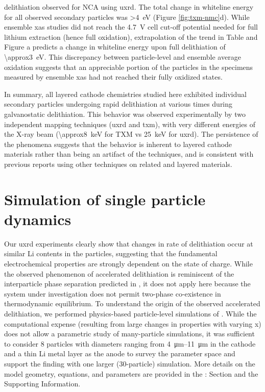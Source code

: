 \documentclass{article}
\begin{document}
delithiation observed for NCA using \gls{uxrd}. The total change in
whiteline energy for all observed secondary particles was \SI{>4}{eV}
(Figure \ref{fig:txm-nmc}d). While ensemble \gls{xas}
studies\cite{deb2005,muto2009} did not reach the \SI{4.7}{V} cell
cut-off potential needed for full lithium extraction (hence full
 oxidation), extrapolation of the trend in Table
 and Figure
a predicts a change in whiteline
energy upon full delithiation of \SI{\approx3}{eV}. This discrepancy
between particle-level and ensemble average  oxidation suggests
that an appreciable portion of the particles in the specimens measured
by ensemble \gls{xas} had not reached their fully oxidized states.

In summary, all layered cathode chemistries studied here exhibited
individual secondary particles undergoing rapid delithiation at
various times during galvanostatic delithiation. This behavior was
observed experimentally by two independent mapping techniques
(\gls{uxrd} and \gls{txm}), with very different energies of the X-ray
beam (\SI{\approx8}{\kilo\electronvolt} for TXM vs
\SI{25}{\kilo\electronvolt} for \gls{uxrd}). The persistence of the
phenomena suggests that the behavior is inherent to layered cathode
materials rather than being an artifact of the techniques, and is
consistent with previous reports using other techniques on related
\nmc{} and  layered
materials\cite{chueh2021,rao2021,wang2020-6}.

\section{Simulation of single particle dynamics}


Our \gls{uxrd} experiments clearly show that changes in rate of
delithiation occur at similar Li contents in the particles, suggesting
that the fundamental electrochemical properties are strongly dependent
on the state of charge. While the observed phenomenon of accelerated
delithiation is reminiscent of the interparticle phase separation
predicted in  \cite{boesenberg2013,thornton2014},
it does not apply here because the system under investigation does not
permit two-phase co-existence in thermodynamic equilibrium. To
understand the origin of the observed accelerated delithiation, we
performed physics-based particle-level simulations of . While
the computational expense (resulting from large changes in properties
with varying x) does not allow a parametric study of many-particle
simulations, it was sufficient to consider 8 particles with diameters
ranging from \SIrange{4}{11}{\micro\meter} in the cathode and a thin
Li metal layer as the anode to survey the parameter space and support
the finding with one larger (30-particle) simulation. More details on
the model geometry, equations, and parameters are provided in the
:  Section and
the Supporting Information.
\end{document}
